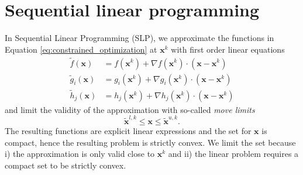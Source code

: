 \section{Sequential linear programming}
In Sequential Linear Programming (SLP), we approximate the functions in Equation \eqref{eq:constrained_optimization} at $\mathbf{x}^k$ with first order linear equations  
\begin{align}
    \tilde{f}(\mathbf{x}) &= f(\mathbf{x}^k) + \nabla f(\mathbf{x}^k) \cdot \left(\mathbf{x} - \mathbf{x}^k \right) \\
    \tilde{g}_i(\mathbf{x}) &= g_i(\mathbf{x}^k) + \nabla g_i(\mathbf{x}^k) \cdot \left(\mathbf{x} - \mathbf{x}^k \right) \\
    \tilde{h}_j(\mathbf{x}) &= h_j(\mathbf{x}^k) + \nabla h_j(\mathbf{x}^k) \cdot \left(\mathbf{x} - \mathbf{x}^k \right)
\end{align}
and limit the validity of the approximation with so-called \emph{move limits} 
\begin{equation}
    \tilde{\mathbf{x}}^{l,k} \le \mathbf{x} \le \tilde{\mathbf{x}}^{u,k}.
\end{equation}
The resulting functions are explicit linear expressions and the set for $\mathbf{x}$ is compact, hence the resulting problem is strictly convex. We limit the set because i) the approximation is only valid close to $\mathbf{x}^k$ and ii) the linear problem requires a compact set to be strictly convex. 


